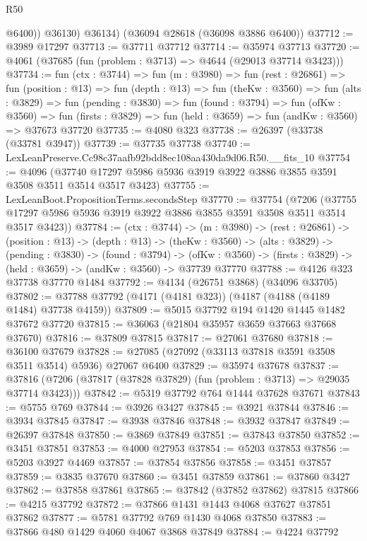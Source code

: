 \begin{lexlean}{R50}
\begin{coremodule}
            @6400))
        @36130)
      @36134)
    (@36094 @28618 (@36098 @3886 @6400))
@37712 := @3989 @17297
@37713 := @37711 @37712
@37714 := @35974 @37713
@37720 := @4061 (@37685 (fun (problem : @3713) => @4644 (@29013 @37714 @3423)))
@37734 := fun (ctx : @3744) =>
  fun (m : @3980) =>
  fun (rest : @26861) =>
  fun (position : @13) =>
  fun (depth : @13) =>
  fun (theKw : @3560) =>
  fun (alts : @3829) =>
  fun (pending : @3830) =>
  fun (found : @3794) =>
  fun (ofKw : @3560) =>
  fun (firsts : @3829) => fun (held : @3659) => fun (andKw : @3560) => @37673 @37720
@37735 := @4080 @323
@37738 := @26397 (@33738 (@33781 @3947))
@37739 := @37735 @37738
@37740 := LexLeanPreserve.Cc98c37aafb92bdd8ec108aa430da9d06.R50.__fits_10
@37754 := @4096
    (@37740 @17297 @5986 @5936 @3919 @3922 @3886 @3855 @3591 @3508 @3511 @3514 @3517 @3423)
@37755 := LexLeanBoot.PropositionTerms.secondsStep
@37770 := @37754
    (@7206 (@37755 @17297 @5986 @5936 @3919 @3922 @3886 @3855 @3591 @3508 @3511 @3514 @3517 @3423))
@37784 := (ctx : @3744) ->
  (m : @3980) ->
  (rest : @26861) ->
  (position : @13) ->
  (depth : @13) ->
  (theKw : @3560) ->
  (alts : @3829) ->
  (pending : @3830) ->
  (found : @3794) ->
  (ofKw : @3560) -> (firsts : @3829) -> (held : @3659) -> (andKw : @3560) -> @37739 @37770
@37788 := @4126 @323 @37738 @37770 @1484
@37792 := @4134 (@26751 @3868) (@34096 @33705)
@37802 := @37788 @37792 (@4171 (@4181 @323)) (@4187 (@4188 (@4189 @1484) @37738 @4159))
@37809 := @5015 @37792 @194 @1420 @1445 @1482 @37672 @37720
@37815 := @36063 (@21804 @35957 @3659 @37663 @37668 @37670)
@37816 := @37809 @37815
@37817 := @27061 @37680
@37818 := @36100 @37679
@37828 := @27085 (@27092 (@33113 @37818 @3591 @3508 @3511 @3514) @5936) @27067 @6400
@37829 := @35974 @37678
@37837 := @37816 (@7206 (@37817 (@37828 @37829) (fun (problem : @3713) => @29035 @37714 @3423)))
@37842 := @5319 @37792 @764 @1444 @37628 @37671
@37843 := @5755 @769
@37844 := @3926 @3427
@37845 := @3921 @37844
@37846 := @3934 @37845
@37847 := @3938 @37846
@37848 := @3932 @37847
@37849 := @26397 @37848
@37850 := @3869 @37849
@37851 := @37843 @37850
@37852 := @3451 @37851
@37853 := @4000 @27953
@37854 := @5203 @37853
@37856 := @5203 @3927 @4469
@37857 := @37854 @37856
@37858 := @3451 @37857
@37859 := @3835 @37670
@37860 := @3451 @37859
@37861 := @37860 @3427
@37862 := @37858 @37861
@37865 := @37842 (@37852 @37862) @37815
@37866 := @4215 @37792
@37872 := @37866 @1431 @1443 @4068 @37627 @37851 @37862
@37877 := @5781 @37792 @769 @1430 @4068 @37850
@37883 := @37866 @480 @1429 @4060 @4067 @3868 @37849
@37884 := @4224 @37792

\end{coremodule}
\end{lexlean}
